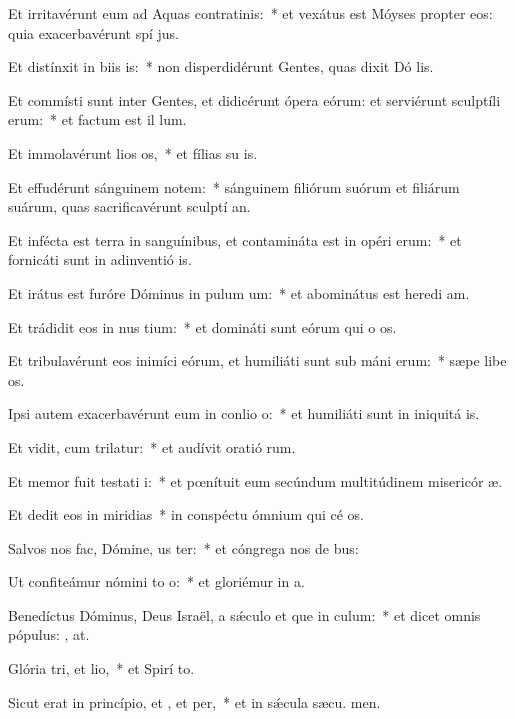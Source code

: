 \item Et irritavérunt eum ad Aquas contratinis:~* et vexátus est Móyses propter eos: quia exacerbavérunt spí jus.
\item Et distínxit in biis is:~* non disperdidérunt Gentes, quas dixit Dó lis.
\item Et commísti sunt inter Gentes, et didicérunt ópera eórum: et serviérunt sculptíli erum:~* et factum est il  lum.
\item Et immolavérunt lios os,~* et fílias su is.
\item Et effudérunt sánguinem notem:~* sánguinem filiórum suórum et filiárum suárum, quas sacrificavérunt sculptí an.
\item Et infécta est terra in sanguínibus, et contamináta est in opéri erum:~* et fornicáti sunt in adinventió is.
\item Et irátus est furóre Dóminus in pulum um:~* et abominátus est heredi am.
\item Et trádidit eos in nus tium:~* et domináti sunt eórum qui o os.
\item Et tribulavérunt eos inimíci eórum, et humiliáti sunt sub máni erum:~* sæpe libe os.
\item Ipsi autem exacerbavérunt eum in conlio o:~* et humiliáti sunt in iniquitá is.
\item Et vidit, cum trilatur:~* et audívit oratió rum.
\item Et memor fuit testati i:~* et pœnítuit eum secúndum multitúdinem misericór æ.
\item Et dedit eos in miridias~* in conspéctu ómnium qui cé os.
\item Salvos nos fac, Dómine, us ter:~* et cóngrega nos de bus:
\item Ut confiteámur nómini to o:~* et gloriémur in  a.
\item Benedíctus Dóminus, Deus Israël, a sǽculo et que in culum:~* et dicet omnis pópulus: , at.
\item Glória tri, et lio,~* et Spirí to.
\item Sicut erat in princípio, et , et per,~* et in sǽcula sæcu. men.

